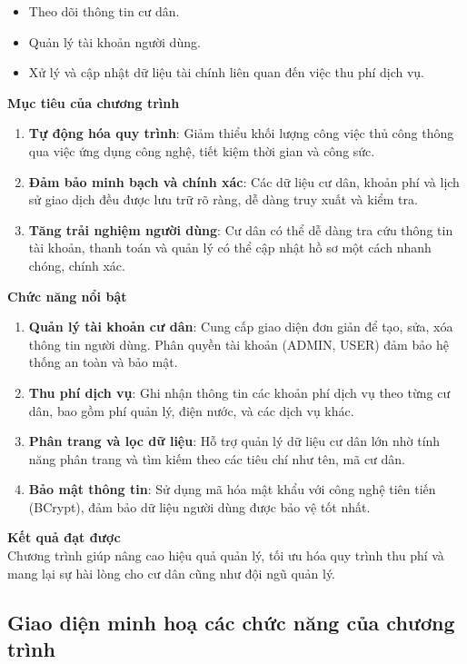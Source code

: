\documentclass{article}
\begin{document}
\begin{itemize}
    \item Theo dõi thông tin cư dân.
    \item Quản lý tài khoản người dùng.
    \item Xử lý và cập nhật dữ liệu tài chính liên quan đến việc thu phí dịch vụ.
\end{itemize}
 \textbf{Mục tiêu của chương trình}
\begin{enumerate}
    \item \textbf{Tự động hóa quy trình}:
Giảm thiểu khối lượng công việc thủ công thông qua việc ứng dụng công nghệ, tiết kiệm thời gian và công sức.
    \item \textbf{Đảm bảo minh bạch và chính xác}:
Các dữ liệu cư dân, khoản phí và lịch sử giao dịch đều được lưu trữ rõ ràng, dễ dàng truy xuất và kiểm tra.
    \item \textbf{Tăng trải nghiệm người dùng}:
Cư dân có thể dễ dàng tra cứu thông tin tài khoản, thanh toán và quản lý có thể cập nhật hồ sơ một cách nhanh chóng, chính xác.
\end{enumerate}
 \textbf{Chức năng nổi bật}
\begin{enumerate}
    \item \textbf{Quản lý tài khoản cư dân}:
Cung cấp giao diện đơn giản để tạo, sửa, xóa thông tin người dùng.
Phân quyền tài khoản (ADMIN, USER) đảm bảo hệ thống an toàn và bảo mật.
    \item \textbf{Thu phí dịch vụ}:
Ghi nhận thông tin các khoản phí dịch vụ theo từng cư dân, bao gồm phí quản lý, điện nước, và các dịch vụ khác.
    \item \textbf{Phân trang và lọc dữ liệu}:
Hỗ trợ quản lý dữ liệu cư dân lớn nhờ tính năng phân trang và tìm kiếm theo các tiêu chí như tên, mã cư dân.
    \item \textbf{Bảo mật thông tin}:
Sử dụng mã hóa mật khẩu với công nghệ tiên tiến (BCrypt), đảm bảo dữ liệu người dùng được bảo vệ tốt nhất.
\end{enumerate}
 \textbf{Kết quả đạt được}\\
Chương trình giúp nâng cao hiệu quả quản lý, tối ưu hóa quy trình thu phí và mang lại sự hài lòng cho cư dân cũng như đội ngũ quản lý.

\subsection{Giao diện minh hoạ các chức năng của chương trình}
\end{document}
